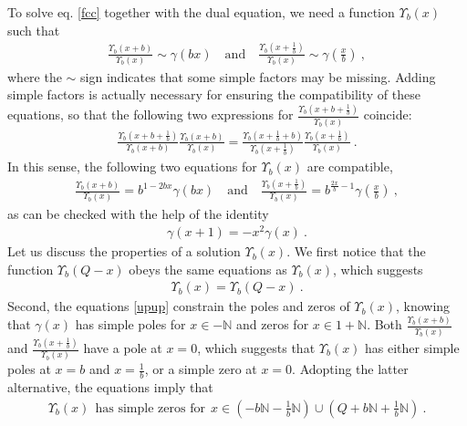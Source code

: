 \documentclass[12pt,a4paper,notitlepage]{report}
\numberwithin{equation}{section}
\theoremstyle{break}
\begin{document}
To solve eq. \eqref{fcc} together with the dual equation, we need a function $\Upsilon_b(x)$ such that 
\begin{align}
 \frac{\Upsilon_b(x+b)}{\Upsilon_b(x)} \sim \gamma(bx)\quad \text{and} \quad \frac{\Upsilon_b(x+\frac{1}{b})}{\Upsilon_b(x)} \sim \gamma(\tfrac{x}{b})\ ,
\end{align}
where the $\sim$ sign indicates that some simple factors may be missing.
Adding simple factors is actually necessary for ensuring the compatibility of these equations, so that the following two expressions for $ \frac{\Upsilon_b(x+b+\frac{1}{b})}{\Upsilon_b(x)}$ coincide:
\begin{align}
  \frac{\Upsilon_b(x+b+\frac{1}{b})}{\Upsilon_b(x+b)} \frac{\Upsilon_b(x+b)}{\Upsilon_b(x)} = \frac{\Upsilon_b(x+\frac{1}{b}+b)}{\Upsilon_b(x+\frac{1}{b})} \frac{\Upsilon_b(x+\frac{1}{b})}{\Upsilon_b(x)} \ .
\end{align}
In this sense, the following two equations for $\Upsilon_b(x)$ are compatible,
\begin{align}
  \boxed{\frac{\Upsilon_b(x+b)}{\Upsilon_b(x)} = b^{1-2bx} \gamma(bx)}\quad \text{and} \quad \boxed{\frac{\Upsilon_b(x+\frac{1}{b})}{\Upsilon_b(x)} = b^{\frac{2x}{b}-1} \gamma(\tfrac{x}{b})}\ ,
\label{upup}
\end{align}
as can be checked with the help of the identity
\begin{align}
 \gamma(x+1) = -x^2 \gamma(x) \ .
\end{align}
Let us discuss the properties of a solution $\Upsilon_b(x)$.
We first notice that the function $\Upsilon_b(Q-x)$ obeys the same equations as $\Upsilon_b(x)$, which suggests 
\begin{align}
 \boxed{\Upsilon_b(x) = \Upsilon_b(Q-x)}\ .
\label{upq}
\end{align}
Second, the equations \eqref{upup} constrain the poles and zeros of  $\Upsilon_b(x)$, knowing that $\gamma(x)$ has simple poles for $x\in -{\mathbb{N}}$ and zeros for $x\in 1+{\mathbb{N}}$.
Both $\frac{\Upsilon_b(x+b)}{\Upsilon_b(x)}$ and $\frac{\Upsilon_b(x+\frac{1}{b})}{\Upsilon_b(x)}$ have a pole at $x=0$, which suggests that $\Upsilon_b(x)$ has either simple poles at $x=b$ and $x=\frac{1}{b}$, or a simple zero at $x=0$.
Adopting the latter alternative, the equations imply that 
\begin{align}
 \boxed{\Upsilon_b(x)\ \ \text{has simple zeros for}\ \ x\in  \left(-b{\mathbb{N}} -\tfrac{1}{b}{\mathbb{N}} \right) \cup \left( Q+b{\mathbb{N}} + \tfrac{1}{b}{\mathbb{N}}\right)} \ .
\label{xbn}
\end{align}
\end{document}
